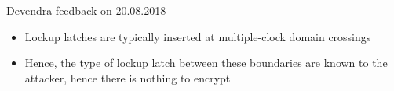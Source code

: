 \begin{frame}{Devendra feedback on 20.08.2018}
\begin{itemize}
\item Lockup latches are typically inserted at multiple-clock domain crossings
\item Hence, the type of lockup latch between these boundaries are known to the attacker, hence there is nothing to encrypt
\end{itemize}
\end{frame}

